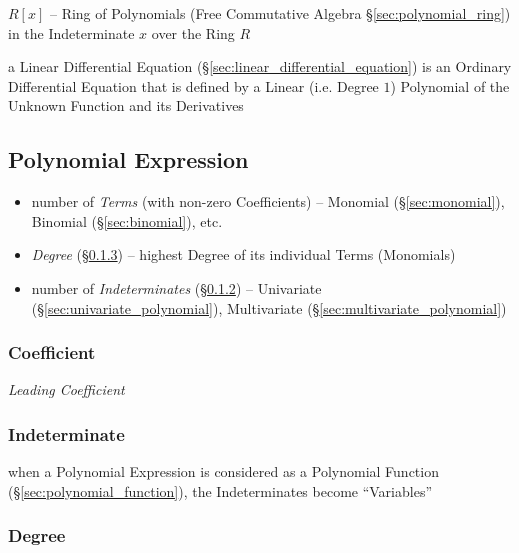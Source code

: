 $R[x]$ -- Ring of Polynomials (Free Commutative Algebra
\S\ref{sec:polynomial_ring}) in the Indeterminate $x$ over the Ring $R$

a Linear Differential Equation (\S\ref{sec:linear_differential_equation}) is an
Ordinary Differential Equation that is defined by a Linear (i.e. Degree $1$)
Polynomial of the Unknown Function and its Derivatives



\subsection{Polynomial Expression}\label{sec:polynomial_expression}

\begin{itemize}
  \item number of \emph{Terms} (with non-zero Coefficients) -- Monomial
    (\S\ref{sec:monomial}), Binomial (\S\ref{sec:binomial}), etc.
  \item \emph{Degree} (\S\ref{sec:degree}) -- highest Degree of its individual
    Terms (Monomials)
  \item number of \emph{Indeterminates} (\S\ref{sec:indeterminate}) --
    Univariate (\S\ref{sec:univariate_polynomial}), Multivariate
    (\S\ref{sec:multivariate_polynomial})
\end{itemize}



\subsubsection{Coefficient}\label{sec:coefficient}

\emph{Leading Coefficient}



\subsubsection{Indeterminate}\label{sec:indeterminate}

when a Polynomial Expression is considered as a Polynomial Function
(\S\ref{sec:polynomial_function}), the Indeterminates become ``Variables''



\subsubsection{Degree}\label{sec:degree}

